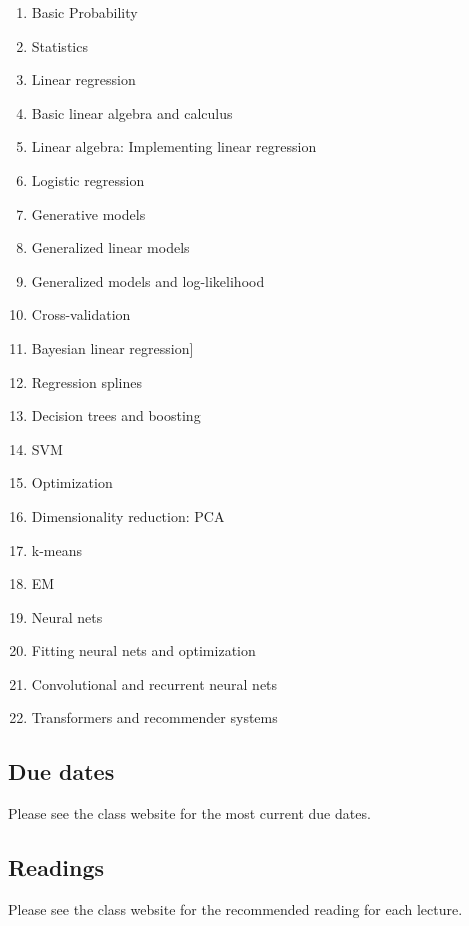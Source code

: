 \documentclass[11pt]{article}
\begin{document}
\begin{enumerate}
\item Basic Probability
\item Statistics
\item Linear regression 
\item Basic linear algebra and calculus
\item Linear algebra: Implementing linear regression
\item Logistic regression
\item Generative models
\item Generalized linear models
\item Generalized models and log-likelihood
\item Cross-validation
\item Bayesian linear regression]
\item Regression splines
\item Decision trees and boosting
\item SVM
\item Optimization
\item Dimensionality reduction: PCA
\item k-means
\item EM
\item Neural nets
\item Fitting neural nets and optimization
\item Convolutional and recurrent neural nets
\item Transformers and recommender systems
\end{enumerate}

\subsection{Due dates}

Please see the class website for the most current due dates.

\subsection{Readings}

Please see the class website for the recommended reading for each lecture.

\end{document}
